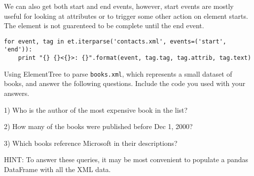 We can also get both start and end events, however, start events are mostly useful for looking at attributes or to trigger some other action on element starts.
The element is not guarenteed to be complete until the end event.

\begin{lstlisting}
for event, tag in et.iterparse('contacts.xml', events=('start', 'end')):
    print "{} {}<{}>: {}".format(event, tag.tag, tag.attrib, tag.text)
\end{lstlisting}

\begin{problem} %
Using ElementTree to parse \texttt{books.xml}, which represents a small dataset of books, and answer the following questions.
Include the code you used with your answers.

1) Who is the author of the most expensive book in the list?

2) How many of the books were published before Dec 1, 2000?

3) Which books reference Microsoft in their descriptions?

HINT: To answer these queries, it may be most convenient to populate a pandas DataFrame with all the XML data.
\end{problem}

